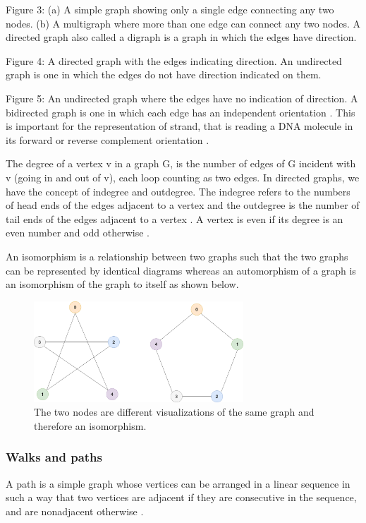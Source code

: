\documentclass[10pt, a4paper]{article}
\begin{document}
Figure 3: (a) A simple graph showing only a single edge connecting any two
nodes. (b) A multigraph where more than one edge can connect any two nodes.
A directed graph also called a digraph is a graph in which the edges have
direction.

Figure 4: A directed graph with the edges indicating direction.
An undirected graph is one in which the edges do not have direction indicated on
them.

Figure 5: An undirected graph where the edges have no indication of direction.
A bidirected graph is one in which each edge has an independent orientation
\cite{edmondsMatchingWellSolvedClass2003}.
This is important for the representation of strand, that is reading a DNA
molecule in its forward or reverse complement orientation 
\cite{patenGenomeGraphsEvolution2017}.

The degree of a vertex v in a graph G, is the number of edges of G incident with
v (going in and out of v), each loop counting as two edges. In directed graphs,
we have the concept of indegree and outdegree. The indegree refers to the
numbers of head ends of the edges adjacent to a vertex and the outdegree is the
number of tail ends of the edges adjacent to a vertex \cite{bondyGraphTheory2011}.
A vertex is even if its degree is an even number and odd otherwise
\cite{trudeauIntroductionGraphTheory1993}.

An isomorphism is a relationship between two graphs such that the two graphs
can be represented by identical diagrams \cite{bondyGraphTheory2011} whereas an 
automorphism of a graph is an isomorphism of the graph to itself as shown below.

\begin{figure}
\centering
\includegraphics[width=0.7\textwidth]{figures/Isomorphism.png}
\caption{\label{fig:org02c8b10}
The two nodes are different visualizations of the same graph and therefore an isomorphism.}
\end{figure}

\subsubsection{Walks and paths}
\label{sec:org6d9ee0d}
A path is a simple graph whose vertices can be arranged in a linear sequence in
such a way that two vertices are adjacent if they are consecutive in the 
sequence, and are nonadjacent otherwise \cite{bondyGraphTheory2011}.
\end{document}
